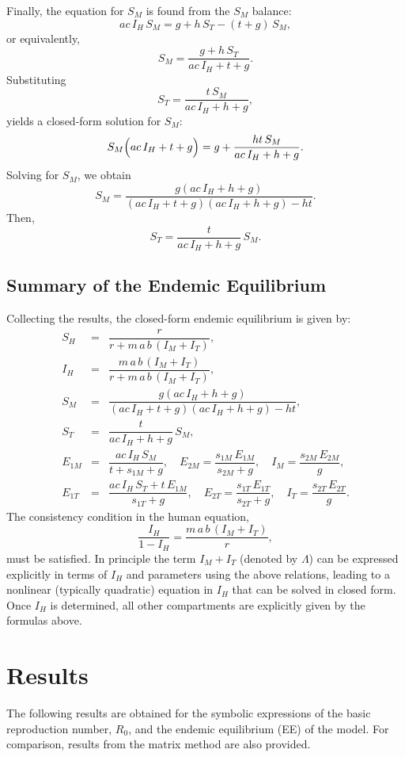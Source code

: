 \documentclass{article}
\begin{document}
Finally, the equation for \(S_M\) is found from the \(S_M\) balance:
\[
ac\,I_H\,S_M =g+h\,S_T-(t+g)\,S_M,
\]
or equivalently,
\[
\boxed{
S_M=\frac{g+h\,S_T}{ac\,I_H+t+g}.
}
\]
Substituting
\[
S_T=\frac{t\,S_M}{ac\,I_H+h+g},
\]
yields a closed-form solution for \(S_M\):
\[
S_M\Bigl(ac\,I_H+t+g\Bigr)=g+\frac{ht\,S_M}{ac\,I_H+h+g}.
\]
Solving for \(S_M\), we obtain
\[
\boxed{
S_M=\frac{g(ac\,I_H+h+g)}{(ac\,I_H+t+g)(ac\,I_H+h+g)-ht}.
}
\]
Then,
\[
\boxed{
S_T=\frac{t}{ac\,I_H+h+g}\,S_M.
}
\]

\subsection{Summary of the Endemic Equilibrium}

Collecting the results, the closed-form endemic equilibrium is given by:
\[
\begin{array}{rcl}
S_H &=& \dfrac{r}{r+m\,a\,b\,(I_M+I_T)},\\[1mm]
I_H &=& \dfrac{m\,a\,b\,(I_M+I_T)}{r+m\,a\,b\,(I_M+I_T)},\\[2mm]
S_M &=& \dfrac{g(ac\,I_H+h+g)}{(ac\,I_H+t+g)(ac\,I_H+h+g)-ht},\\[2mm]
S_T &=& \dfrac{t}{ac\,I_H+h+g}\,S_M,\\[2mm]
E_{1M} &=& \dfrac{ac\,I_H\,S_M}{t+s_{1M}+g},\quad
E_{2M}=\dfrac{s_{1M}\,E_{1M}}{s_{2M}+g},\quad
I_M=\dfrac{s_{2M}\,E_{2M}}{g},\\[2mm]
E_{1T} &=& \dfrac{ac\,I_H\,S_T+t\,E_{1M}}{s_{1T}+g},\quad
E_{2T}=\dfrac{s_{1T}\,E_{1T}}{s_{2T}+g},\quad
I_T=\dfrac{s_{2T}\,E_{2T}}{g}.
\end{array}
\]
The consistency condition in the human equation,
\[
\frac{I_H}{1-I_H}=\frac{m\,a\,b\,(I_M+I_T)}{r},
\]
must be satisfied. In principle the term \(I_M+I_T\) (denoted by \(\Lambda\)) can be expressed explicitly in terms of \(I_H\) and parameters using the above relations, leading to a nonlinear (typically quadratic) equation in \(I_H\) that can be solved in closed form. Once \(I_H\) is determined, all other compartments are explicitly given by the formulas above.

\bigskip

\section{Results}
The following results are obtained for the symbolic expressions of the basic reproduction number, \(R_0\), and the endemic equilibrium (EE) of the model. For comparison, results from the matrix method are also provided.
\end{document}
